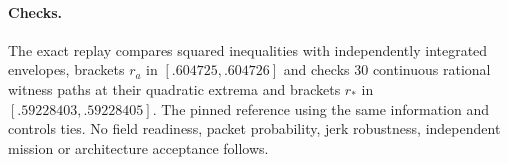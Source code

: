 \documentclass{article}
\begin{document}
\paragraph{Checks.}
The exact replay compares squared inequalities with independently
integrated envelopes, brackets $r_a$ in $[.604725,.604726]$ and
checks 30 continuous rational witness paths at their quadratic
extrema and brackets $r_*$ in $[.59228403,.59228405]$. The pinned reference using the same information and
controls ties. No field readiness, packet probability, jerk
robustness, independent mission or architecture acceptance follows.
\end{document}
